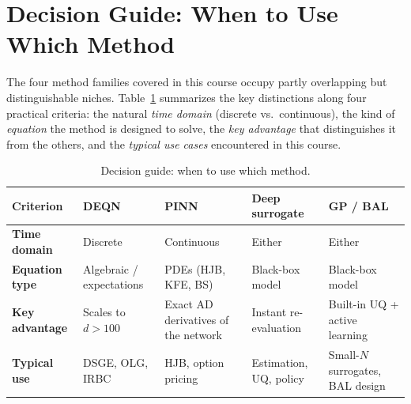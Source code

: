 \documentclass[11pt,a4paper]{report}
\begin{document}
\section{Decision Guide: When to Use Which Method}

The four method families covered in this course occupy partly overlapping but distinguishable niches.  Table~\ref{tab:method_decision_guide} summarizes the key distinctions along four practical criteria: the natural \emph{time domain} (discrete vs.\ continuous), the kind of \emph{equation} the method is designed to solve, the \emph{key advantage} that distinguishes it from the others, and the \emph{typical use cases} encountered in this course.

\begin{table}[H]
\centering
\small
\renewcommand{\arraystretch}{1.2}
\setlength{\tabcolsep}{4pt}
\begin{tabular}{@{} >{\bfseries}p{2.6cm}
                     >{\raggedright\arraybackslash}p{2.9cm}
                     >{\raggedright\arraybackslash}p{3.3cm}
                     >{\raggedright\arraybackslash}p{3.0cm}
                     >{\raggedright\arraybackslash}p{3.0cm} @{}}
\toprule
\textbf{Criterion} & \textbf{DEQN} & \textbf{PINN} & \textbf{Deep surrogate} & \textbf{GP / BAL} \\
\midrule
Time domain   & Discrete & Continuous & Either & Either \\
Equation type & Algebraic / expectations & PDEs (HJB, KFE, BS) & Black-box model & Black-box model \\
Key advantage & Scales to $d>100$ & Exact AD derivatives of the network & Instant re-evaluation & Built-in UQ + active learning \\
Typical use   & DSGE, OLG, IRBC & HJB, option pricing & Estimation, UQ, policy & Small-$N$ surrogates, BAL design \\
\bottomrule
\end{tabular}
\caption{Decision guide: when to use which method.}
\label{tab:method_decision_guide}
\end{table}
\end{document}
